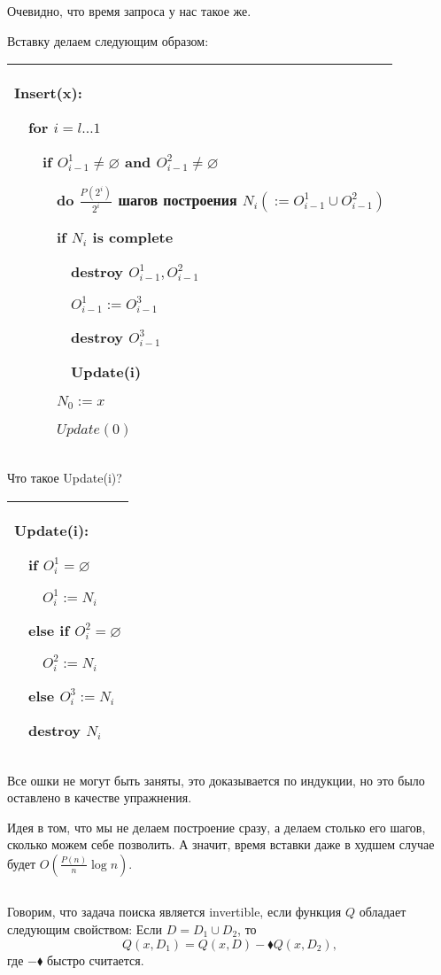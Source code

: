 Очевидно, что время запроса у нас такое же.

Вставку делаем следующим образом:

\begin{tabular}{|p{9cm}|}
\hline
Insert(x):

$\quad$for $i=l \ldots 1$

$\quad$$\quad$if $O^1_{i-1} \ne \varnothing$ and $O^2_{i-1} \ne \varnothing$

$\quad$$\quad$$\quad$do $\frac{P(2^i)}{2^i}$ шагов построения $N_i(:=O^1_{i-1}\cup O_{i-1}^2)$

$\quad$$\quad$$\quad$if $N_i$ is complete

$\quad$$\quad$$\quad$$\quad$destroy $O_{i-1}^1,O_{i-1}^2$

$\quad$$\quad$$\quad$$\quad$$O^1_{i-1}:=O_{i-1}^3$

$\quad$$\quad$$\quad$$\quad$destroy $O_{i-1}^3$


$\quad$$\quad$$\quad$$\quad$Update(i)

$\quad$$\quad$$\quad$$N_0:=x$

$\quad$$\quad$$\quad$$Update(0)$\\

\hline
\end{tabular}

Что такое Update(i)?

\begin{tabular}{|p{3cm}|}
\hline
Update(i):

$\quad$if $O^1_i=\varnothing$

$\quad$$\quad$$O^1_i:=N_i$

$\quad$else if $O_i^2 = \varnothing$

$\quad$$\quad$$O_i^2:=N_i$

$\quad$else $O_i^3:=N_i$

$\quad$destroy $N_i$\\

\hline
\end{tabular}






Все ошки не могут быть заняты, это доказывается по индукции, но это было оставлено в качестве упражнения.

Идея в том, что мы не делаем построение сразу, а делаем столько его шагов, сколько можем себе позволить. А значит, время вставки даже в худшем случае будет $O\left(\frac{P(n)}{n}\log n\right)$.

\subsection{}
\begin{definition}
Говорим, что задача поиска является invertible, если функция $Q$ обладает следующим свойством:
Если $D=D_1\cup D_2$, то
\[Q(x,D_1)=Q(x,D)-\blacklozenge Q(x,D_2),\]
где $-\blacklozenge$ быстро считается.
\end{definition}

